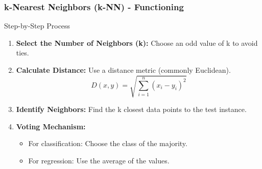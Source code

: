 \documentclass[aspectratio=169]{beamer}
\begin{document}
\begin{frame}[fragile]
    \frametitle{k-Nearest Neighbors (k-NN) - Functioning}
    \begin{block}{Step-by-Step Process}
        \begin{enumerate}
            \item \textbf{Select the Number of Neighbors (k):} Choose an odd value of k to avoid ties.
            \item \textbf{Calculate Distance:} Use a distance metric (commonly Euclidean).
                \begin{equation}
                D(x, y) = \sqrt{\sum_{i=1}^{n} (x_i - y_i)^2}
                \end{equation}
            \item \textbf{Identify Neighbors:} Find the k closest data points to the test instance.
            \item \textbf{Voting Mechanism:} 
                \begin{itemize}
                    \item For classification: Choose the class of the majority.
                    \item For regression: Use the average of the values.
                \end{itemize}
        \end{enumerate}
    \end{block}
\end{frame}
\end{document}
